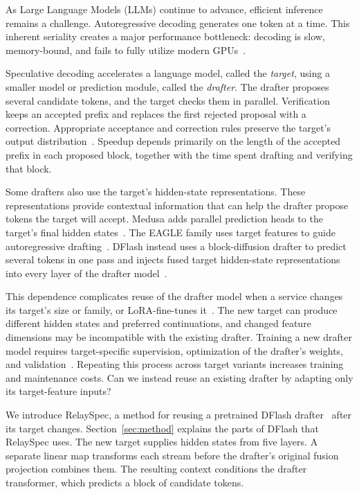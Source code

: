 As Large Language Models (LLMs) continue to advance, efficient inference remains a challenge. Autoregressive decoding generates one token at a time. This inherent seriality creates a major performance bottleneck: decoding is slow, memory-bound, and fails to fully utilize modern GPUs~\citep{cai2024medusa}.

Speculative decoding accelerates a language model, called the \emph{target}, using a smaller model or prediction module, called the \emph{drafter}. The drafter proposes several candidate tokens, and the target checks them in parallel. Verification keeps an accepted prefix and replaces the first rejected proposal with a correction. Appropriate acceptance and correction rules preserve the target's output distribution~\citep{leviathan2023speculative,chen2023sampling}. Speedup depends primarily on the length of the accepted prefix in each proposed block, together with the time spent drafting and verifying that block.

Some drafters also use the target's hidden-state representations. These representations provide contextual information that can help the drafter propose tokens the target will accept. Medusa adds parallel prediction heads to the target's final hidden states~\citep{cai2024medusa}. The EAGLE family uses target features to guide autoregressive drafting~\citep{li2024eagle,li2024eagle2,li2025eagle3}. DFlash instead uses a block-diffusion drafter to predict several tokens in one pass and injects fused target hidden-state representations into every layer of the drafter model~\citep{chen2026dflash}.

This dependence complicates reuse of the drafter model when a service changes its target's size or family, or LoRA-fine-tunes it~\citep{hu2022lora}. The new target can produce different hidden states and preferred continuations, and changed feature dimensions may be incompatible with the existing drafter. Training a new drafter model requires target-specific supervision, optimization of the drafter's weights, and validation~\citep{li2025eagle3,chen2026dflash}. Repeating this process across target variants increases training and maintenance costs. Can we instead reuse an existing drafter by adapting only its target-feature inputs?

We introduce RelaySpec, a method for reusing a pretrained DFlash drafter~\citep{chen2026dflash} after its target changes. Section~\ref{sec:method} explains the parts of DFlash that RelaySpec uses. The new target supplies hidden states from five layers. A separate linear map transforms each stream before the drafter's original fusion projection combines them. The resulting context conditions the drafter transformer, which predicts a block of candidate tokens.

